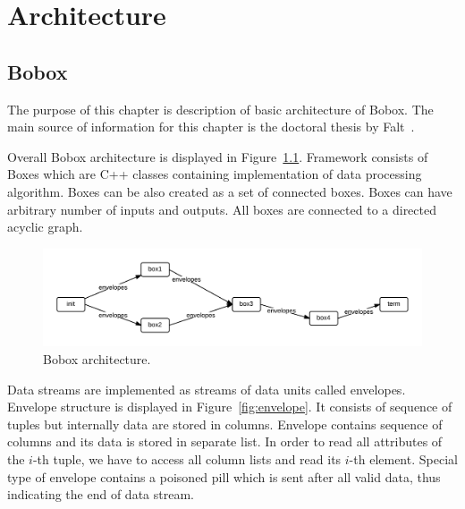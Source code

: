 \chapter{Architecture}

\section{Bobox}

The purpose of this chapter is description of basic architecture of Bobox. The main source of information for this chapter is the doctoral thesis by Falt~\cite{faltthesis}. 

Overall Bobox architecture is displayed in Figure~\ref{fig:bobox}. Framework consists of Boxes which are C++ classes containing implementation of data processing algorithm. Boxes can be also created as a set of connected boxes. Boxes can have arbitrary number of inputs and outputs. All boxes are connected to a directed acyclic graph.  

\begin{figure}[h!]
  \centering
    \includegraphics[width=1\textwidth]{bobox}

      \caption{Bobox architecture.}
          \label{fig:bobox}
\end{figure}

Data streams are implemented as streams of data units called envelopes. Envelope structure is displayed in Figure~\ref{fig:envelope}. It consists of sequence of tuples but internally data are stored in columns. Envelope contains sequence of columns and its data is stored in separate list. In order to read all attributes of the $i$-th tuple, we have to access all column lists and read its $i$-th element. Special type of envelope contains a poisoned pill which is sent after all valid data, thus indicating the end of data stream. 

